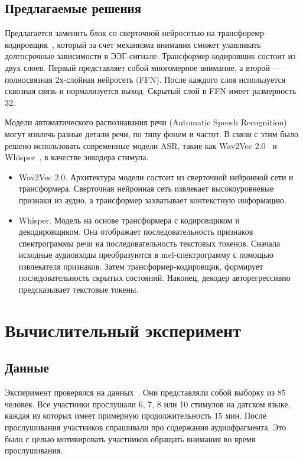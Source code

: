 \documentclass{article}
\begin{document}
    \subsection{Предлагаемые решения}
    Предлагается заменить блок со сверточной нейросетью на трансфоремр-кодировщик~\citep{vaswani2023attention}, который за счет механизма внимания сможет улавливать долгосрочные зависимости в ЭЭГ-сигнале. Трансформер-кодировщик состоит из двух слоев. Первый представляет собой многомерное внимание, а второй --- полносвязная 2х-слойная нейросеть (FFN). После каждого слоя используется сквозная связь и нормализуется выход. Скрытый слой в FFN имеет размерность 32. \par 
    Модели автоматического распознавания речи (Automatic Speech Recognition) могут извлечь разные детали речи, по типу фонем и частот. В связи с этим было решено использовать современные модели ASR, такие как Wav2Vec 2.0~\citep{baevski2020wav2vec} и Whisper~\citep{radford2022robust}, в качестве энкодера стимула.
    \begin{itemize}
        \item Wav2Vec 2.0. Архитектура модели состоит из сверточной нейронной сети и трансформера. Сверточная нейронная сеть извлекает высокоуровневые признаки из аудио, а трансформер захватывает контекстную информацию.
        \item Whisper. Модель на основе трансформера с кодировщиком и декодировщиком. Она отображает последовательность признаков спектрограммы речи на последовательность текстовых токенов. Сначала исходные аудиовходы преобразуются в mel-спектрограмму с помощью извлекателя признаков. Затем трансформер-кодировщик, формирует последовательность скрытых состояний. Наконец, декодер авторегрессивно предсказывает текстовые токены.
    \end{itemize}
    

\section{Вычислительный эксперимент}
    
\subsection{Данные}
    Эксперимент проверялся на данных~\citep{K3VSND_2023}. Они представляли собой выборку из 85 человек. Все участники прослушали 6, 7, 8 или 10 стимулов на датском языке, каждая из которых имеет примерную продолжительность 15 мин. После прослушивания участников спрашивали про содержания аудиофрагмента. Это было с целью мотивировать участников обращать внимания во время прослушивания.
\end{document}
